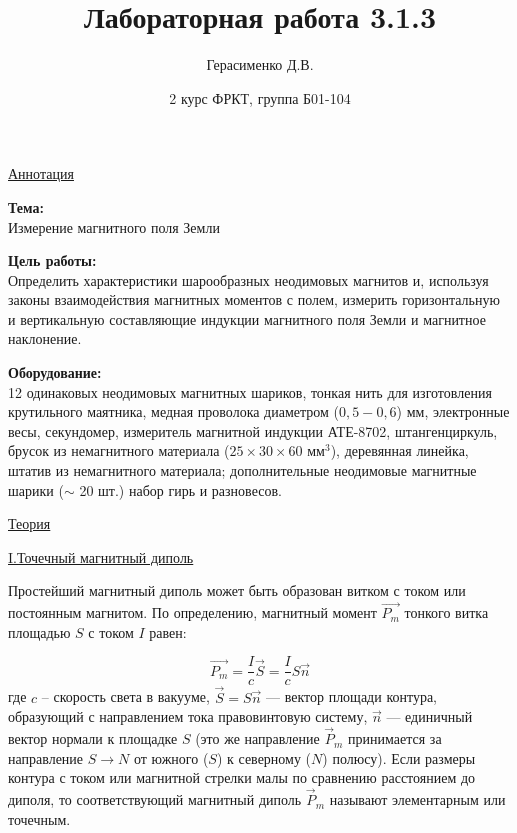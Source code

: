 \documentclass{article}
\title{
    \textbf{Лабораторная работа 3.1.3}
}
\author{Герасименко Д.В.}
\date{2 курс ФРКТ, группа Б01-104}
\begin{document}
\maketitle

\begin{center}
    \raggedleft
        \underline{\underline{\LARGE {Аннотация}}}
\end{center}

\begin{center}
\raggedright
    \large{\textbf{Тема:}}
    \\
    \large {Измерение магнитного поля Земли}
    
    \large{\textbf{Цель работы:}}
    \\
    \large {Определить характеристики шарообразных неодимовых магнитов и, используя законы взаимодействия магнитных моментов с полем, измерить горизонтальную и вертикальную составляющие индукции магнитного поля Земли и магнитное наклонение.}
    
    \large{\textbf{Оборудование:}}
    \\
    \large{12 одинаковых неодимовых магнитных шариков, тонкая нить для изготовления крутильного маятника, медная проволока диаметром ($0,5 - 0,6$) мм, электронные весы, секундомер, измеритель магнитной индукции АТЕ-8702, штангенциркуль, брусок из немагнитного материала ($25\times30\times60$ мм$^3$), деревянная линейка, штатив из немагнитного материала; дополнительные неодимовые магнитные шарики ($\sim$ 20 шт.) набор гирь и разновесов.}
\end{center}

\begin{center}
    \raggedleft
        \underline{\underline{\LARGE {Теория}}}
\end{center}

\begin{center}
    \underline{\large {\RN{1}.Точечный магнитный диполь}}
\end{center}

Простейший магнитный диполь может быть образован витком с током или постоянным магнитом. По определению, магнитный момент $\vec{P_m}$ тонкого витка площадью $S$ с током $I$ равен:

\begin{equation}
    \vec{P_m} = \dfrac{I}{c}\vec{S} = \dfrac{I}{c} S \vec{n}
\end{equation} 
где $c$ – скорость света в вакууме, $\vec{S} = S \vec{n}$ — вектор площади контура, образующий с направлением тока правовинтовую систему, $\vec{n}$ --- единичный вектор нормали к площадке $S$ (это же направление $\vec{P}_m$ принимается за направление $S \to N$ от южного ($S$) к северному ($N$) полюсу). Если размеры контура с током или магнитной стрелки малы по сравнению расстоянием до диполя, то соответствующий магнитный диполь $\vec{P}_m$ называют элементарным или точечным.
\end{document}
